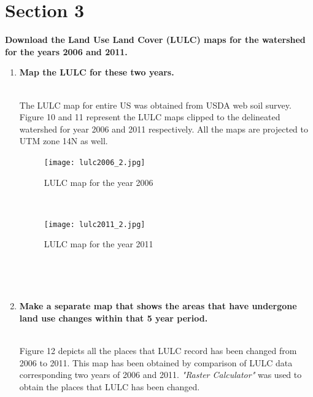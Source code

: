 \documentclass[letterpaper,12pt]{article}
\begin{document}
\section*{Section 3}	
\textbf{Download the Land Use Land Cover (LULC) maps for the watershed for the years 2006 and 2011.}
\\
\begin{enumerate}
	\item \textbf{Map the LULC for these two years.}\\~
	
	The LULC map for entire US was obtained from USDA web soil survey. Figure 10 and 11 represent the LULC maps clipped to the delineated watershed for year 2006 and 2011 respectively. All the maps are projected to UTM zone 14N as well.
	
	\begin{figure}[H]
		\begin{center}
			\texttt{[image: lulc2006\_2.jpg]}
		\end{center}
		\caption{LULC map for the year 2006}
	\end{figure}~
	
	\begin{figure}[H]
		\begin{center}
			\texttt{[image: lulc2011\_2.jpg]}
		\end{center}
		\caption{LULC map for the year 2011}
	\end{figure}~
	
	~\item \textbf{Make a separate map that shows the areas that have undergone land use changes within that 5 year period.}\\~
	
	Figure 12 depicts all the places that LULC record has been changed from 2006 to 2011. This map has been obtained by comparison of LULC data corresponding two years of 2006 and 2011. \emph{"Raster Calculator"} was used to obtain the places that LULC has been changed.


\end{enumerate}
\end{document}
